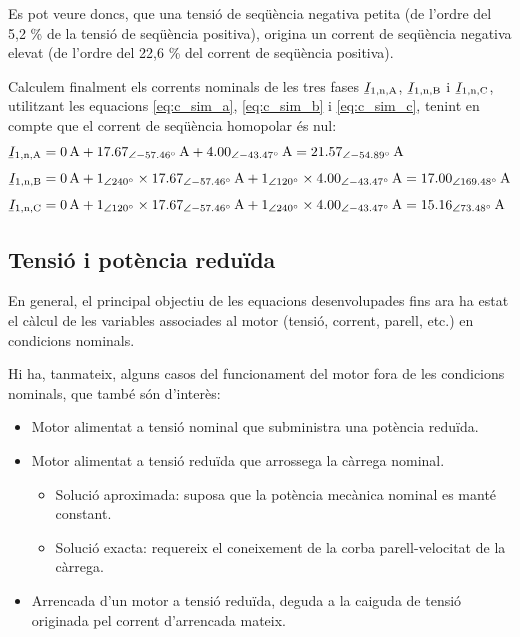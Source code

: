 \begin{exemple}
	Es pot veure doncs, que una tensió de seqüència negativa petita (de l'ordre del 5,2 \% de la tensió de seqüència positiva), origina un corrent de seqüència negativa elevat (de l'ordre del 22,6 \% del corrent de seqüència positiva). 
	
	Calculem finalment els corrents nominals de les tres fases $\cmplx{I}\ped{1,n,A}$, $\cmplx{I}\ped{1,n,B}$ i $\cmplx{I}\ped{1,n,C}$, utilitzant les equacions \eqref{eq:c_sim_a},
	\eqref{eq:c_sim_b} i \eqref{eq:c_sim_c}, tenint en compte que el corrent de seqüència homopolar és nul:
	\begin{align*}
		\cmplx{I}\ped{1,n,A} &= \SI{0}{A} + \SIpd{17,67}{-57,46}{A} +
		\SIpd{4,00}{-43,47}{A}  =
		\SIpd{21,57}{-54,89}{A} \\[1ex]
		\cmplx{I}\ped{1,n,B} &= \SI{0}{A} + \numpd{1}{240} \times
		\SIpd{17,67}{-57,46}{A} + \numpd{1}{120} \times
		\SIpd{4,00}{-43,47}{A}  =
		\SIpd{17,00}{169,48}{A}    \\[1ex]
		\cmplx{I}\ped{1,n,C} &= \SI{0}{A} + \numpd{1}{120} \times
		\SIpd{17,67}{-57,46}{A} +
		\numpd{1}{240} \times \SIpd{4,00}{-43,47}{A}  =
		\SIpd{15,16}{73,48}{A}
\end{align*}
	
\end{exemple}
	

\subsection{Tensió i potència reduïda}\label{sec:mot-tens-pot-red}

En general, el principal objectiu de les equacions desenvolupades fins ara ha estat  el càlcul de les variables associades al motor (tensió, corrent, parell, etc.) en condicions nominals.

Hi ha, tanmateix, alguns casos del funcionament del motor fora de les condicions nominals, que també són d'interès: 
\begin{itemize}
	\item  Motor alimentat a tensió nominal que subministra una potència reduïda.
	\item  Motor alimentat a tensió reduïda que arrossega la càrrega nominal.
	\begin{itemize}
		\item Solució aproximada: suposa que la potència mecànica nominal es manté constant.
		\item Solució exacta: requereix el coneixement de la corba parell-velocitat de la càrrega.
	\end{itemize}	
	\item Arrencada d'un motor a tensió reduïda, deguda a la caiguda de tensió originada pel corrent d'arrencada mateix.
\end{itemize}

